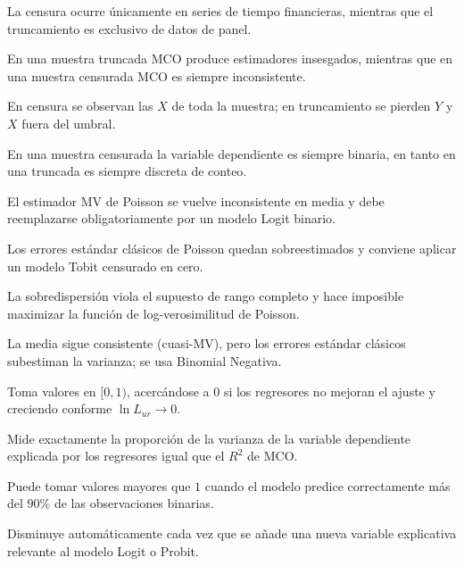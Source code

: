 \begin{opts}
    \item La censura ocurre únicamente en series de tiempo financieras, mientras que el truncamiento es exclusivo de datos de panel.
    \item En una muestra truncada MCO produce estimadores insesgados, mientras que en una muestra censurada MCO es siempre inconsistente.
    \item En censura se observan las $X$ de toda la muestra; en truncamiento se pierden $Y$ y $X$ fuera del umbral.
    \item En una muestra censurada la variable dependiente es siempre binaria, en tanto en una truncada es siempre discreta de conteo.
\end{opts}

\begin{opts}
    \item El estimador MV de Poisson se vuelve inconsistente en media y debe reemplazarse obligatoriamente por un modelo Logit binario.
    \item Los errores estándar clásicos de Poisson quedan sobreestimados y conviene aplicar un modelo Tobit censurado en cero.
    \item La sobredispersión viola el supuesto de rango completo y hace imposible maximizar la función de log-verosimilitud de Poisson.
    \item La media sigue consistente (cuasi-MV), pero los errores estándar clásicos subestiman la varianza; se usa Binomial Negativa.
\end{opts}

\begin{opts}
    \item Toma valores en $[0, 1)$, acercándose a $0$ si los regresores no mejoran el ajuste y creciendo conforme $\ln L_{ur} \to 0$.
    \item Mide exactamente la proporción de la varianza de la variable dependiente explicada por los regresores igual que el $R^2$ de MCO.
    \item Puede tomar valores mayores que $1$ cuando el modelo predice correctamente más del $90\%$ de las observaciones binarias.
    \item Disminuye automáticamente cada vez que se añade una nueva variable explicativa relevante al modelo Logit o Probit.
\end{opts}

